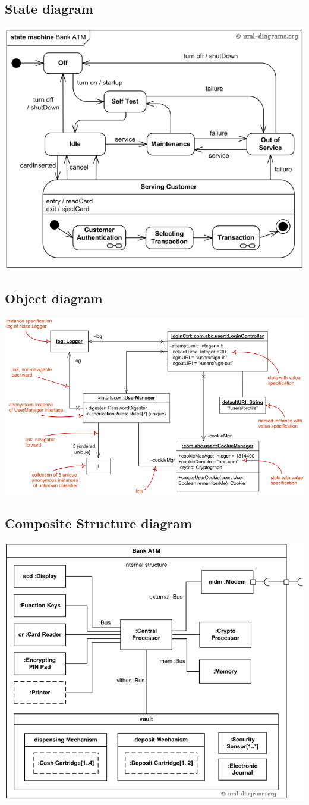 \subsection{State diagram}
\includegraphics[angle=90,origin=c,width=0.8\linewidth]{4-uml/state.png}

\subsection{Object diagram}
\includegraphics[angle=90,origin=c,width=\linewidth]{4-uml/object.png}

\subsection{Composite Structure diagram}
\includegraphics[angle=90,origin=c,width=0.8\linewidth]{4-uml/composite.png}

